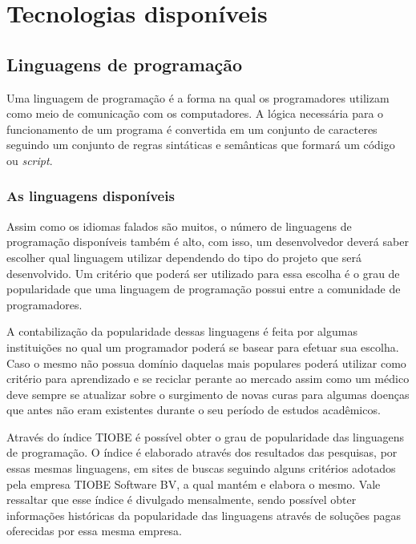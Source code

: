 \chapter{Tecnologias disponíveis} \label{Tecnologias disponíveis}

\section{Linguagens de programação}

Uma linguagem de programação é a forma na qual os programadores utilizam como meio de comunicação com os computadores\cite{edirlei2015}. A lógica necessária para o funcionamento de um programa é convertida em um conjunto de caracteres seguindo um conjunto de regras sintáticas e semânticas que formará um código ou \textit{script}.\cite{fischerGrodzinsky1993}

\subsection{As linguagens disponíveis}

Assim como os idiomas falados são muitos, o número de linguagens de programação disponíveis também é alto, com isso, um desenvolvedor deverá saber escolher qual linguagem utilizar dependendo do tipo do projeto que será desenvolvido. Um critério que poderá ser utilizado para essa escolha é o grau de popularidade que uma linguagem de programação possui entre a comunidade de programadores.

A contabilização da popularidade dessas linguagens é feita por algumas instituições no qual um programador poderá se basear para efetuar sua escolha. Caso o mesmo não possua domínio daquelas mais populares poderá utilizar como critério para aprendizado e se reciclar perante ao mercado assim como um médico deve sempre se atualizar sobre o surgimento de novas curas para algumas doenças que antes não eram existentes durante o seu período de estudos acadêmicos.

Através do índice TIOBE\cite{tiobeDefinition} é possível obter o grau de popularidade das linguagens de programação. O índice é elaborado através dos resultados das pesquisas, por essas mesmas linguagens, em sites de buscas seguindo alguns critérios adotados pela empresa TIOBE Software BV\cite{tiobeAbout}, a qual mantém e elabora o mesmo. Vale ressaltar que esse índice é divulgado mensalmente, sendo possível obter informações históricas da popularidade das linguagens através de soluções pagas oferecidas por essa mesma empresa.

